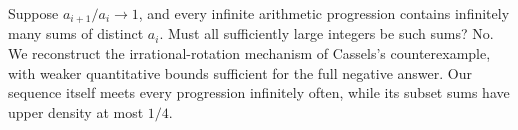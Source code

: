 Suppose $a_{i+1}/a_i\to1$, and every infinite arithmetic
progression contains infinitely many sums of distinct $a_i$.
Must all sufficiently large integers be such sums? No.
We reconstruct the irrational-rotation mechanism of Cassels's
counterexample, with weaker quantitative bounds sufficient for
the full negative answer. Our sequence itself meets every
progression infinitely often, while its subset sums have upper
density at most $1/4$.
